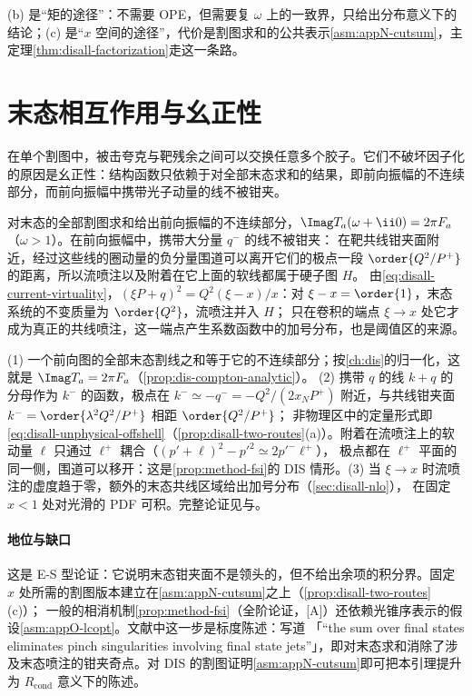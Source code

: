 \noindent
(b) 是“矩的途径”：不需要 OPE，但需要复 $\omega$ 上的一致界，只给出分布意义下的结论；(c) 是“$x$ 空间的途径”，代价是割图求和的公共表示\cref{asm:appN-cutsum}，主定理\cref{thm:disall-factorization}走这一条路。

\section{末态相互作用与幺正性}\label{sec:disall-fsi}

在单个割图中，被击夸克与靶残余之间可以交换任意多个胶子。它们不破坏因子化的原因是幺正性：结构函数只依赖于对全部末态求和的结果，即前向振幅的不连续部分，而前向振幅中携带光子动量的线不被钳夹。

\begin{lemma}\label{lem:disall-fsi}
对末态的全部割图求和给出前向振幅的不连续部分，$\Imag T_a(\omega+\ii0)=2\pi F_a$（$\omega>1$）。在前向振幅中，携带大分量 $q^-$ 的线不被钳夹：
在靶共线钳夹面附近，经过这些线的圈动量的负分量围道可以离开它们的极点一段 $\order{Q^2/P^+}$ 的距离，所以流喷注以及附着在它上面的软线都属于硬子图 $H$。
由\cref{eq:disall-current-virtuality}，$(\xi P+q)^2=Q^2(\xi-x)/x$：对 $\xi-x=\order{1}$，末态系统的不变质量为 $\order{Q^2}$，流喷注并入 $H$；
只在卷积的端点 $\xi\to x$ 处它才成为真正的共线喷注，这一端点产生系数函数中的加号分布，也是阈值区的来源。
\end{lemma}

\begin{proofsketch}
(1) 一个前向图的全部末态割线之和等于它的不连续部分；按\cref{ch:dis}的归一化，这就是 $\Imag T_a=2\pi F_a$（\cref{prop:dis-compton-analytic}）。
(2) 携带 $q$ 的线 $k+q$ 的分母作为 $k^-$ 的函数，极点在 $k^-\simeq-q^-=-Q^2/(2x_NP^+)$ 附近，与共线钳夹面 $k^-=\order{\lambda^2Q^2/P^+}$ 相距 $\order{Q^2/P^+}$；
非物理区中的定量形式即\cref{eq:disall-unphysical-offshell}（\cref{prop:disall-two-routes}(a)）。附着在流喷注上的软动量 $\ell$ 只通过 $\ell^+$ 耦合（$(p'+\ell)^2-p'^2\simeq2p'^-\ell^+$），
极点都在 $\ell^+$ 平面的同一侧，围道可以移开：这是\cref{prop:method-fsi}的 DIS 情形。(3) 当 $\xi\to x$ 时流喷注的虚度趋于零，额外的末态共线区域给出加号分布（\cref{sec:disall-nlo}），
在固定 $x<1$ 处对光滑的 PDF 可积。完整论证见\cite[第~8.7~节]{CollinsSoperSterman1989}与\cite{LibbySterman1978a}。
\end{proofsketch}

\paragraph{地位与缺口}
这是 E-S 型论证：它说明末态钳夹面不是领头的，但不给出余项的积分界。固定 $x$ 处所需的割图版本建立在\cref{asm:appN-cutsum}之上（\cref{prop:disall-two-routes}(c)）；
一般的相消机制\cref{prop:method-fsi}（全阶论证，[A]）还依赖光锥序表示的假设\cref{asm:appO-lcopt}。文献中这一步是标度陈述：\cite[第~8.7~节]{CollinsSoperSterman1989}写道
「“the sum over final states eliminates pinch singularities involving final state jets”」，即对末态求和消除了涉及末态喷注的钳夹奇点。对 DIS 的割图证明\cref{asm:appN-cutsum}即可把本引理提升为 $R_{\mathrm{cond}}$ 意义下的陈述。


